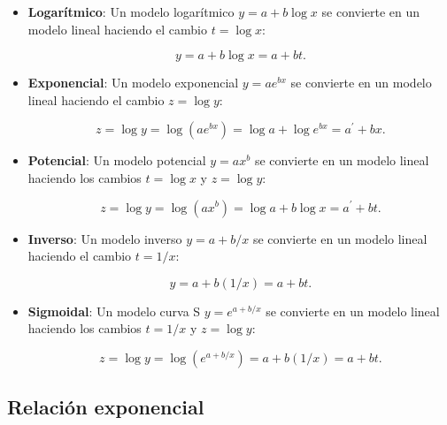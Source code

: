 \documentclass[
  spanish,
  a4paper,
]{scrreport}
\theoremstyle{plain}
\theoremstyle{definition}
\theoremstyle{definition}
\theoremstyle{remark}
\begin{document}
\begin{itemize}
\item
  \textbf{Logarítmico}: Un modelo logarítmico \(y = a+b \log x\) se
  convierte en un modelo lineal haciendo el cambio \(t=\log x\):

  \[y=a+b\log x = a+bt.\]
\item
  \textbf{Exponencial}: Un modelo exponencial \(y = ae^{bx}\) se
  convierte en un modelo lineal haciendo el cambio \(z = \log y\):

  \[z = \log y = \log(ae^{bx}) =  \log a + \log e^{bx} = a^\prime +bx.\]
\item
  \textbf{Potencial}: Un modelo potencial \(y = ax^b\) se convierte en
  un modelo lineal haciendo los cambios \(t=\log x\) y \(z=\log y\):

  \[z = \log y = \log(ax^b) = \log a + b \log x = a^\prime+bt.\]
\item
  \textbf{Inverso}: Un modelo inverso \(y = a+b/x\) se convierte en un
  modelo lineal haciendo el cambio \(t=1/x\):

  \[y = a + b(1/x) = a+bt.\]
\item
  \textbf{Sigmoidal}: Un modelo curva S \(y = e^{a+b/x}\) se convierte
  en un modelo lineal haciendo los cambios \(t=1/x\) y \(z=\log y\):

  \[z = \log y = \log (e^{a+b/x}) = a+b(1/x) = a+bt.\]
\end{itemize}

\subsection{Relación exponencial}\label{relaciuxf3n-exponencial}
\end{document}
